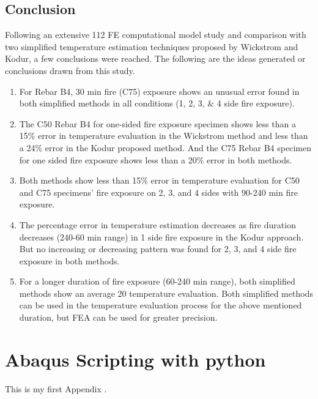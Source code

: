 \documentclass[12pt, letterpaper, oneside]{report}
\begin{document}
\section{Conclusion}
Following an extensive 112 FE computational model study and comparison with two simplified temperature estimation techniques proposed by Wickstrom and Kodur, a few conclusions were reached. The following are the ideas generated or conclusions drawn from this study.
\begin{enumerate}
  \item For Rebar B4, 30 min fire (C75) exposure shows an unusual   error found in both simplified methods in all conditions (1, 2, 3, & 4 side fire exposure).
  \item The C50 Rebar B4 for one-sided fire exposure specimen shows less than a 15\% error in temperature evaluation in the
Wickstrom method and less than a 24\% error in the Kodur proposed method. And the C75 Rebar B4 specimen for one sided fire exposure shows less than a 20\% error in both methods.
  \item Both methods show less than 15\% error in temperature evaluation for C50 and C75 specimens' fire exposure on 2, 3,
and 4 sides with 90-240 min fire exposure.
  \item The percentage error in temperature estimation decreases as fire duration decreases (240-60 min range) in 1 side fire
exposure in the Kodur approach. But no increasing or decreasing pattern was found for 2, 3, and 4 side fire exposure
in both methods.
  \item For a longer duration of fire exposure (60-240 min range), both simplified methods show an average 20%
temperature evaluation. Both simplified methods can be used in the temperature evaluation process for the above mentioned duration, but FEA can be used for greater precision.
\end{enumerate}
 
\newpage

\renewcommand{\bibname}{References}


\newpage
\appendix
\chapter{Abaqus Scripting with python}
This is my first Appendix .
\end{document}
